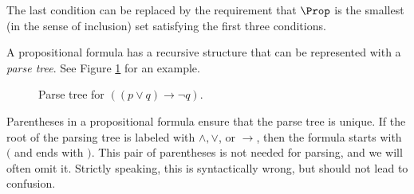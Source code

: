 

\setcounter{section}{1}
\setcounter{subsection}{1}
\setcounter{dfn}{1}

The last condition can be replaced by the requirement that $\Prop$ is the smallest (in the sense of inclusion) set satisfying the first three conditions.

A propositional formula has a recursive structure that can be represented with a \emph{parse tree}.
See Figure \ref{fig:ParseTreeProp} for an example.

\begin{figure}[ht]
\begin{center}

\end{center}
\caption{Parse tree for $((p \vee q) \to \neg q)$.}
\label{fig:ParseTreeProp}
\end{figure}

Parentheses in a propositional formula ensure that the parse tree is unique.
If the root of the parsing tree is labeled with $\wedge, \vee$, or $\to$, then the formula starts with $($ and ends with $)$.
This pair of parentheses is not needed for parsing, and we will often omit it.
Strictly speaking, this is syntactically wrong, but should not lead to confusion.




